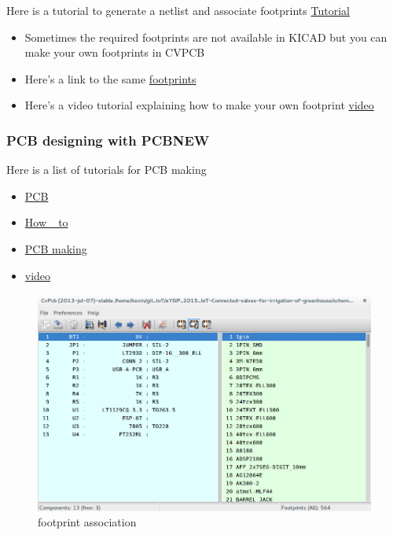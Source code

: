 \documentclass[16pt]{article}
\begin{document}
Here is a tutorial to generate a netlist and associate footprints
{\color{red}\href{https://www.youtube.com/watch?v=8HNMihqa844}{Tutorial}}

\begin{itemize}

\item
  Sometimes the required footprints are not available in KICAD but you
  can make your own footprints in CVPCB
\item
 Here's a link to the same
{\color{red}\href{http://kicadhowto.wikidot.com/mcf1foot1}{footprints}}
\item
Here's a video tutorial explaining how to make your own footprint
{\color{red}\href{https://www.youtube.com/watch?v=aVNMJVaRf6M}{video}}
\end{itemize}



\subsubsection{PCB designing with
PCBNEW}
Here is a list of tutorials for PCB making


\begin{itemize}

\item
{\color{red}\href{http://store.curiousinventor.com/guides/kicad/pcb_layout/change_part/}{PCB}}
\item
{\color{red}\href{http://kicadhowto.wikidot.com/}{How \_to}}
\item
{\color{red}\href{http://store.curiousinventor.com/guides/kicad/pcb_layout/}{PCB
 making}}
\item
{\color{red}\href{https://www.youtube.com/watch?v=TYqmmj6SO-k}{video}}
\end{itemize}

\hfill 


\begin{figure}
\includegraphics[width=1\textwidth]{images/cvpcb.png}
\caption{footprint association}
\end{figure}
\end{document}
